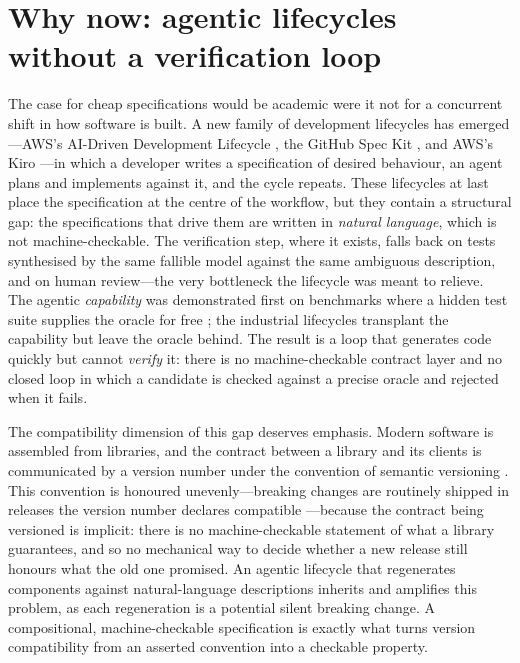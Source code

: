 \section{Why now: agentic lifecycles without a verification loop}

The case for cheap specifications would be academic were it not for a concurrent
shift in how software is built. A new family of development lifecycles has
emerged---AWS's AI-Driven Development Lifecycle \citep{awsaidlc}, the GitHub Spec
Kit \citep{githubspeckit}, and AWS's Kiro \citep{awskiro}---in which a developer
writes a specification of desired behaviour, an agent plans and implements against
it, and the cycle repeats. These lifecycles at last place the specification at the
centre of the workflow, but they contain a structural gap: the specifications that
drive them are written in \emph{natural language}, which is not machine-checkable.
The verification step, where it exists, falls back on tests synthesised by the same
fallible model against the same ambiguous description, and on human review---the
very bottleneck the lifecycle was meant to relieve. The agentic \emph{capability}
was demonstrated first on benchmarks where a hidden test suite supplies the oracle
for free \citep{jimenez2024swebench}; the industrial lifecycles transplant the
capability but leave the oracle behind. The result is a loop that generates code
quickly but cannot \emph{verify} it: there is no machine-checkable contract layer
and no closed loop in which a candidate is checked against a precise oracle and
rejected when it fails.

The compatibility dimension of this gap deserves emphasis. Modern software is
assembled from libraries, and the contract between a library and its clients is
communicated by a version number under the convention of semantic versioning
\citep{preston2013semver}. This convention is honoured unevenly---breaking changes
are routinely shipped in releases the version number declares compatible
\citep{raemaekers2017semver}---because the contract being versioned is implicit:
there is no machine-checkable statement of what a library guarantees, and so no
mechanical way to decide whether a new release still honours what the old one
promised. An agentic lifecycle that regenerates components against natural-language
descriptions inherits and amplifies this problem, as each regeneration is a
potential silent breaking change. A compositional, machine-checkable specification
is exactly what turns version compatibility from an asserted convention into a
checkable property.


